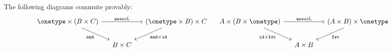 \begin{lemma}\label{lem:triangle-left-or-right}
    The following diagrams commute provably:
    \[
    \begin{tikzcd}[column sep=small]
        \onetype \times \left( B \times C \right)
        \ar[rr, "\assoclterm"]
        \ar[dr, "\sndterm"']
        && \left(\onetype \times B \right) \times C
        \ar[dl, "{\sndterm \times \idterm}"]
        \\
        & B \times C
    \end{tikzcd}
    \quad 
    \begin{tikzcd}[column sep=small]
        A \times \left( B \times \onetype \right)
        \ar[rr, "\assoclterm"]
        \ar[dr, "{\idterm \times \fstterm}"']
        && \left(A \times B \right) \times \onetype
        \ar[dl, "\fstterm"]
        \\
        & A \times B
    \end{tikzcd}
    \]
\end{lemma}
